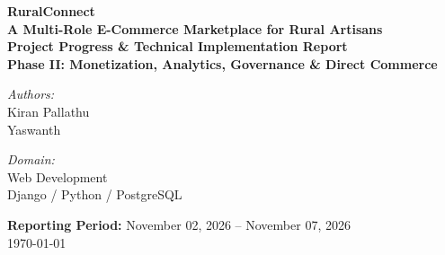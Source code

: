 \documentclass[12pt,a4paper]{article}
\begin{document}
\begin{titlepage}
    \centering
    \vspace*{1.5cm}
    
    {\Huge \textbf{RuralConnect}}\\[0.4cm]
    {\Large \textbf{A Multi-Role E-Commerce Marketplace for Rural Artisans}}\\[1.5cm]
    \textbf{Project Progress \& Technical Implementation Report}\\[0.5cm]
    {\large \textbf{Phase II: Monetization, Analytics, Governance \& Direct Commerce}}\\[2.0cm]
    
    \begin{minipage}{0.45\textwidth}
        \begin{flushleft} \large
            \emph{Authors:}\\
            Kiran Pallathu\\
            Yaswanth\\
        \end{flushleft}
    \end{minipage}
    \begin{minipage}{0.45\textwidth}
        \begin{flushright} \large
            \emph{Domain:}\\
            Web Development\\
            Django / Python / PostgreSQL
        \end{flushright}
    \end{minipage}
    
    \vfill
    {\large \textbf{Reporting Period:} November 02, 2026 -- November 07, 2026}\\[0.3cm]
    {\large \today}
\end{titlepage}

\tableofcontents
\newpage
{}
\end{document}
